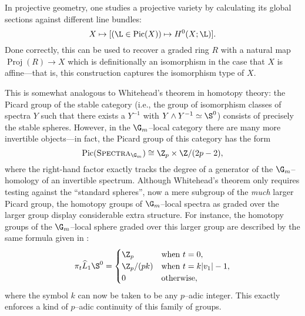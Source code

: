 In projective geometry, one studies a projective variety by calculating its global sections against different line bundles: \[X \mapsto [(\L \in \Pic(X)) \mapsto H^0(X; \L)].\]  Done correctly, this can be used to recover a graded ring \(R\) with a natural map \(\operatorname{Proj}(R) \to X\) which is definitionally an isomorphism in the case that \(X\) is affine---that is, this construction captures the isomorphism type of \(X\).

This is somewhat analogous to Whitehead's theorem in homotopy theory: the Picard group of the stable category (i.e., the group of isomorphism classes of spectra \(Y\) such that there exists a \(Y^{-1}\) with \(Y \sm Y^{-1} \simeq \S^0\)) consists of precisely the stable spheres.  However, in the \(\G_m\)--local category there are many more invertible objects---in fact, the Picard group of this category has the form \[\operatorname{Pic}(\CatOf{Spectra}_{\G_m}) \cong \Z_p \times \Z / (2p-2),\] where the right-hand factor exactly tracks the degree of a generator of the \(\G_m\)--homology of an invertible spectrum.  Although Whitehead's theorem only requires testing against the ``standard spheres'', now a mere subgroup of the \emph{much} larger Picard group, the homotopy groups of \(\G_m\)--local spectra as graded over the larger group display considerable extra structure.  For instance, the homotopy groups of the \(\G_m\)--local sphere graded over this larger group are described by the same formula given in : \[\pi_t \widehat L_1 \S^0 = \begin{cases} \Z_p & \text{when \(t = 0\)}, \\ \Z_p / (pk) & \text{when \(t = k|v_1| - 1\)}, \\ 0 & \text{otherwise}, \end{cases}\] where the symbol \(k\) can now be taken to be any \(p\)--adic integer.  This exactly enforces a kind of \(p\)--adic continuity of this family of groups.

